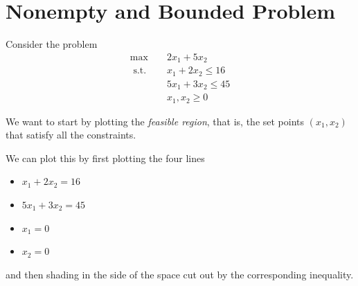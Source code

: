 \section{Nonempty and Bounded Problem}
Consider the problem
\begin{align*}
\max \quad & 2 x_1+5 x_2 \\
\text { s.t. } \quad 
&x_1+2 x_2 \leq 16 \\
&5 x_1+3 x_2 \leq  45 \\
&x_1, x_2  \geq 0
\end{align*}

We want to start by plotting the \emph{feasible region}, that is, the set points $(x_1,x_2)$ that satisfy all the constraints. 

We can plot this by first plotting the four lines
\begin{itemize}
\item $x_1+2 x_2 = 16$
\item $5 x_1+3 x_2 = 45$
\item $x_1 = 0$
\item $x_2= 0$
\end{itemize}
and then shading in the side of the space cut out by the corresponding inequality.

